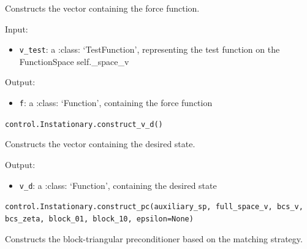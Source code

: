 \documentclass[letterpaper,10pt,english]{sphinxmanual}
\begin{document}
Constructs the vector containing the force function.

Input:
\begin{itemize}
\item \texttt{v{\_}test}: a :class: `TestFunction', representing the test
            function on the FunctionSpace self.\_space\_v
\end{itemize}

Output:
\begin{itemize}
\item \texttt{f}: a :class: `Function', containing the force function
\end{itemize}

\vspace{3ex}

\texttt{control.Instationary.construct{\_}v{\_}d()}

Constructs the vector containing the desired state.

Output:
\begin{itemize}
\item \texttt{v{\_}d}: a :class: `Function', containing the desired state
\end{itemize}

\vspace{3ex}

\texttt{control.Instationary.construct{\_}pc(auxiliary{\_}sp, full{\_}space{\_}v, bcs{\_}v, bcs{\_}zeta, block{\_}01, block{\_}10, epsilon=None)}

Constructs the block-triangular preconditioner based on the matching
        strategy.
\end{document}
